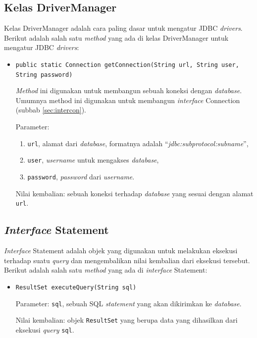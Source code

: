 \subsection{Kelas DriverManager}
\label{sec:drivermanager}
Kelas DriverManager adalah cara paling dasar untuk mengatur JDBC \textit{drivers}\cite{javadocumentation}. Berikut adalah salah satu \textit{method} yang ada di kelas DriverManager untuk mengatur JDBC \textit{drivers}:
\begin{itemize}
	\item \texttt{public static Connection getConnection(String url, String user, String password)}
	
	\textit{Method} ini digunakan untuk membangun sebuah koneksi dengan \textit{database}. Umumnya method ini digunakan untuk membangun \textit{interface} Connection (subbab \ref{sec:intercon}).
	
	Parameter:
	\begin{enumerate}
		\item \texttt{url}, alamat dari \textit{database}, formatnya adalah ``\textit{jdbc:\textit{subprotocol}:\textit{subname}}'',
		\item \texttt{user}, \textit{username} untuk mengakses \textit{database},
		\item \texttt{password}, \textit{password} dari \textit{username}.
	\end{enumerate}
	
	Nilai kembalian: sebuah koneksi terhadap \textit{database} yang sesuai dengan alamat \texttt{url}.
\end{itemize}

\subsection{\textit{Interface} Statement}
\label{sec:statement}
\textit{Interface} Statement adalah objek yang digunakan untuk melakukan eksekusi terhadap suatu \textit{query} dan mengembalikan nilai kembalian dari eksekusi tersebut\cite{javadocumentation}. Berikut adalah salah satu \textit{method} yang ada di \textit{interface} Statement:
\begin{itemize}
	\item \texttt{ResultSet executeQuery(String sql)}
	
	Parameter: \texttt{sql}, sebuah SQL \textit{statement} yang akan dikirimkan ke \textit{database}.
	
	Nilai kembalian: objek \texttt{ResultSet} yang berupa data yang dihasilkan dari eksekusi \textit{query} \texttt{sql}.
\end{itemize}

